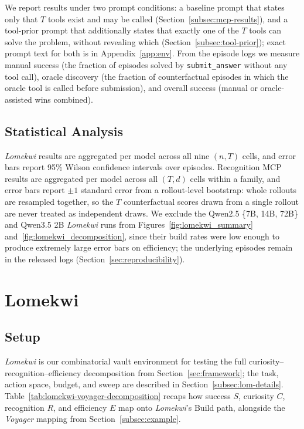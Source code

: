 \documentclass{article}
\begin{document}
We report results under two prompt conditions: a baseline prompt that states only that $T$ tools exist and may be called (Section~\ref{subsec:mcp-results}), and a tool-prior prompt that additionally states that exactly one of the $T$ tools can solve the problem, without revealing which (Section~\ref{subsec:tool-prior}); exact prompt text for both is in Appendix~\ref{app:env}. From the episode logs we measure manual success (the fraction of episodes solved by \texttt{submit\_answer} without any tool call), oracle discovery (the fraction of counterfactual episodes in which the oracle tool is called before submission), and overall success (manual or oracle-assisted wins combined).

\subsection{Statistical Analysis}
\label{subsec:stats}

\emph{Lomekwi} results are aggregated per model across all nine $(n,T)$ cells, and error bars report 95\% Wilson confidence intervals over episodes. Recognition MCP results are aggregated per model across all $(T,d)$ cells within a family, and error bars report $\pm 1$ standard error from a rollout-level bootstrap: whole rollouts are resampled together, so the $T$ counterfactual scores drawn from a single rollout are never treated as independent draws. We exclude the Qwen2.5 \{7B, 14B, 72B\} and Qwen3.5 2B \emph{Lomekwi} runs from Figures~\ref{fig:lomekwi_summary} and~\ref{fig:lomekwi_decomposition}, since their build rates were low enough to produce extremely large error bars on efficiency; the underlying episodes remain in the released logs (Section~\ref{sec:reproducibility}).

\section{Lomekwi}
\label{sec:lomekwi}

\subsection{Setup}
\label{subsec:lom-env}

\emph{Lomekwi} is our combinatorial vault environment for testing the full curiosity--recognition--efficiency decomposition from Section~\ref{sec:framework}; the task, action space, budget, and sweep are described in Section~\ref{subsec:lom-details}. Table~\ref{tab:lomekwi-voyager-decomposition} recaps how success $S$, curiosity $C$, recognition $R$, and efficiency $E$ map onto \emph{Lomekwi}'s Build path, alongside the \textit{Voyager} mapping from Section~\ref{subsec:example}.
\end{document}
